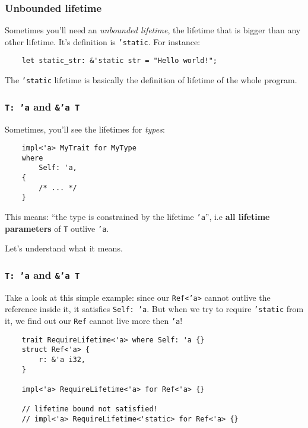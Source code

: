 \documentclass[aspectratio=1610,t]{beamer}
\begin{document}

\begin{frame}[fragile]
\frametitle{Unbounded lifetime}
Sometimes you'll need an \textit{unbounded lifetime}, the lifetime that is bigger than any other lifetime. It's definition is \texttt{'static}. For instance:

\begin{verbatim}
    let static_str: &'static str = "Hello world!";
\end{verbatim}

The \texttt{'static} lifetime is basically the definition of lifetime of the whole program. 
\end{frame}


\begin{frame}[fragile]
\frametitle{\texttt{T: 'a} and \texttt{\&'a T}}
Sometimes, you'll see the lifetimes for \textit{types}:

\begin{verbatim}
    impl<'a> MyTrait for MyType
    where
        Self: 'a,
    {
        /* ... */
    }
\end{verbatim}

This means: ``the type is constrained by the lifetime \texttt{'a}'', i.e \textbf{all lifetime parameters} of \texttt{T} outlive \texttt{'a}.

Let's understand what it means.
\end{frame}


\begin{frame}[fragile]
\frametitle{\texttt{T: 'a} and \texttt{\&'a T}}
Take a look at this simple example: since our \texttt{Ref<'a>} cannot outlive the reference inside it, it satisfies \texttt{Self: 'a}. But when we try to require \texttt{'static} from it, we find out our \texttt{Ref} cannot live more then \texttt{'a}!

\begin{verbatim}
    trait RequireLifetime<'a> where Self: 'a {}
    struct Ref<'a> {
        r: &'a i32,
    }

    impl<'a> RequireLifetime<'a> for Ref<'a> {}

    // lifetime bound not satisfied!
    // impl<'a> RequireLifetime<'static> for Ref<'a> {}
\end{verbatim}
\end{frame}
\end{document}
